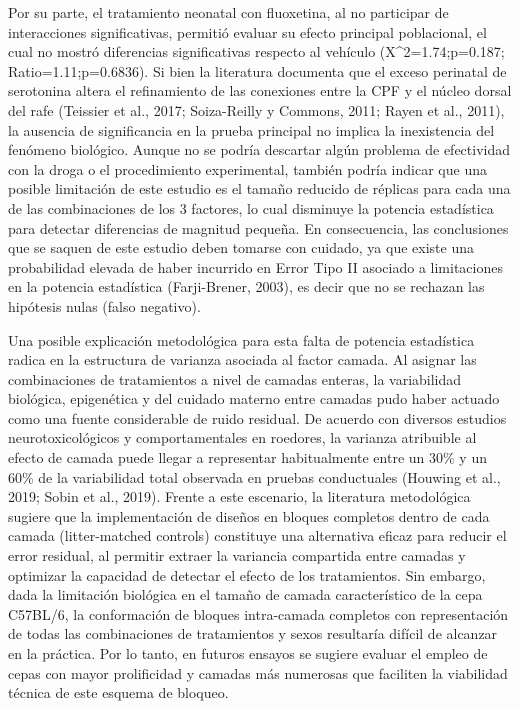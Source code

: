 \documentclass[
  letterpaper,
  DIV=11,
  numbers=noendperiod]{scrartcl}
\begin{document}
Por su parte, el tratamiento neonatal con fluoxetina, al no participar
de interacciones significativas, permitió evaluar su efecto principal
poblacional, el cual no mostró diferencias significativas respecto al
vehículo (X\^{}2=1.74;p=0.187; Ratio=1.11;p=0.6836). Si bien la
literatura documenta que el exceso perinatal de serotonina altera el
refinamiento de las conexiones entre la CPF y el núcleo dorsal del rafe
(Teissier et al., 2017; Soiza-Reilly y Commons, 2011; Rayen et al.,
2011), la ausencia de significancia en la prueba principal no implica la
inexistencia del fenómeno biológico. Aunque no se podría descartar algún
problema de efectividad con la droga o el procedimiento experimental,
también podría indicar que una posible limitación de este estudio es el
tamaño reducido de réplicas para cada una de las combinaciones de los 3
factores, lo cual disminuye la potencia estadística para detectar
diferencias de magnitud pequeña. En consecuencia, las conclusiones que
se saquen de este estudio deben tomarse con cuidado, ya que existe una
probabilidad elevada de haber incurrido en Error Tipo II asociado a
limitaciones en la potencia estadística (Farji-Brener, 2003), es decir
que no se rechazan las hipótesis nulas (falso negativo).

Una posible explicación metodológica para esta falta de potencia
estadística radica en la estructura de varianza asociada al factor
camada. Al asignar las combinaciones de tratamientos a nivel de camadas
enteras, la variabilidad biológica, epigenética y del cuidado materno
entre camadas pudo haber actuado como una fuente considerable de ruido
residual. De acuerdo con diversos estudios neurotoxicológicos y
comportamentales en roedores, la varianza atribuible al efecto de camada
puede llegar a representar habitualmente entre un 30\% y un 60\% de la
variabilidad total observada en pruebas conductuales (Houwing et al.,
2019; Sobin et al., 2019). Frente a este escenario, la literatura
metodológica sugiere que la implementación de diseños en bloques
completos dentro de cada camada (litter-matched controls) constituye una
alternativa eficaz para reducir el error residual, al permitir extraer
la variancia compartida entre camadas y optimizar la capacidad de
detectar el efecto de los tratamientos. Sin embargo, dada la limitación
biológica en el tamaño de camada característico de la cepa C57BL/6, la
conformación de bloques intra-camada completos con representación de
todas las combinaciones de tratamientos y sexos resultaría difícil de
alcanzar en la práctica. Por lo tanto, en futuros ensayos se sugiere
evaluar el empleo de cepas con mayor prolificidad y camadas más
numerosas que faciliten la viabilidad técnica de este esquema de
bloqueo.
\end{document}

